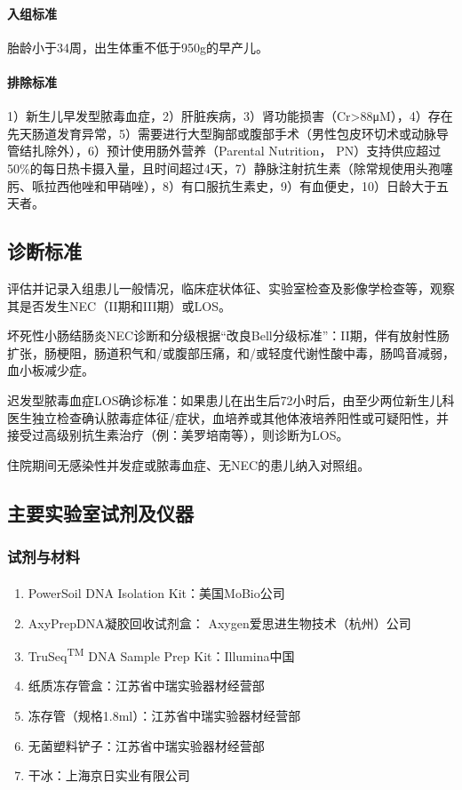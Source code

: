       \paragraph{入组标准}
      胎龄小于34周，出生体重不低于950g的早产儿。
      \paragraph{排除标准}
      1）新生儿早发型脓毒血症，2）肝脏疾病，3）肾功能损害（Cr>88μM），4）存在先天肠道发育异常，5）需要进行大型胸部或腹部手术（男性包皮环切术或动脉导管结扎除外），6）预计使用肠外营养（Parental Nutrition， PN）支持供应超过50\%的每日热卡摄入量，且时间超过4天，7）静脉注射抗生素（除常规使用头孢噻肟、哌拉西他唑和甲硝唑），8）有口服抗生素史，9）有血便史，10）日龄大于五天者。
  \subsection{诊断标准}
  评估并记录入组患儿一般情况，临床症状体征、实验室检查及影像学检查等，观察其是否发生NEC（II期和III期）或LOS。

  坏死性小肠结肠炎NEC诊断和分级根据“改良Bell分级标准”\cite{bell1978neonatal}：II期，伴有放射性肠扩张，肠梗阻，肠道积气和/或腹部压痛，和/或轻度代谢性酸中毒，肠鸣音减弱，血小板减少症。

  迟发型脓毒血症LOS确诊标准：如果患儿在出生后72小时后，由至少两位新生儿科医生独立检查确认脓毒症体征/症状，血培养或其他体液培养阳性或可疑阳性，并接受过高级别抗生素治疗（例：美罗培南等），则诊断为LOS。

  住院期间无感染性并发症或脓毒血症、无NEC的患儿纳入对照组。

  \subsection{主要实验室试剂及仪器}
  \label{主要实验室试剂及仪器}
    \subsubsection{试剂与材料}
    \begin{enumerate}
      \item PowerSoil\textsuperscript{\textregistered} DNA Isolation Kit：美国MoBio公司
      \item AxyPrepDNA凝胶回收试剂盒： Axygen爱思进生物技术（杭州）公司
      \item TruSeq\textsuperscript{TM} DNA Sample Prep Kit：Illumina中国
      \item 纸质冻存管盒：江苏省中瑞实验器材经营部
      \item 冻存管（规格1.8ml）：江苏省中瑞实验器材经营部
      \item 无菌塑料铲子：江苏省中瑞实验器材经营部
      \item 干冰：上海京日实业有限公司
    \end{enumerate}
